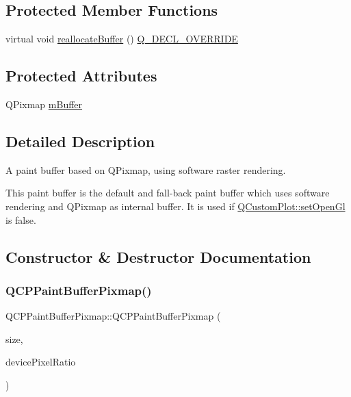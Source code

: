 \subsection*{Protected Member Functions}
\begin{DoxyCompactItemize}
\item 
virtual void \hyperlink{class_q_c_p_paint_buffer_pixmap_ad49f3205ba3463b1c44f8db3cfcc90f0}{reallocate\+Buffer} () \hyperlink{qcustomplot_8h_a42cc5eaeb25b85f8b52d2a4b94c56f55}{Q\+\_\+\+D\+E\+C\+L\+\_\+\+O\+V\+E\+R\+R\+I\+DE}
\end{DoxyCompactItemize}
\subsection*{Protected Attributes}
\begin{DoxyCompactItemize}
\item 
Q\+Pixmap \hyperlink{class_q_c_p_paint_buffer_pixmap_a6d7009f45f03e305f2dc00e52a9225f8}{m\+Buffer}
\end{DoxyCompactItemize}


\subsection{Detailed Description}
A paint buffer based on Q\+Pixmap, using software raster rendering. 

This paint buffer is the default and fall-\/back paint buffer which uses software rendering and Q\+Pixmap as internal buffer. It is used if \hyperlink{class_q_custom_plot_a7db1adc09016329f3aef7c60da935789}{Q\+Custom\+Plot\+::set\+Open\+Gl} is false. 

\subsection{Constructor \& Destructor Documentation}
\mbox{\label{class_q_c_p_paint_buffer_pixmap_aef0224e03b9285509391fcd61a8e6844}} 
\subsubsection{\texorpdfstring{Q\+C\+P\+Paint\+Buffer\+Pixmap()}{QCPPaintBufferPixmap()}}
{\footnotesize\ttfamily Q\+C\+P\+Paint\+Buffer\+Pixmap\+::\+Q\+C\+P\+Paint\+Buffer\+Pixmap (\begin{DoxyParamCaption}\item[{const Q\+Size \&}]{size,  }\item[{double}]{device\+Pixel\+Ratio }\end{DoxyParamCaption})\hspace{0.3cm}{\ttfamily [explicit]}}

